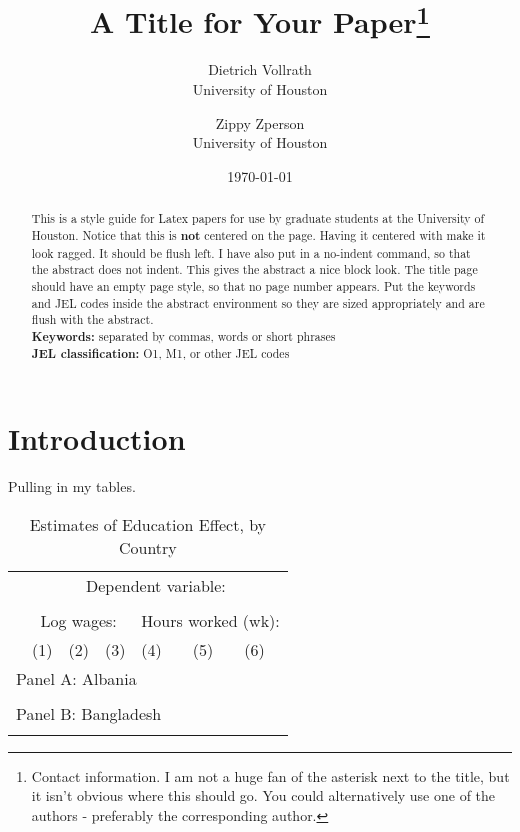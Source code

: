 \documentclass[11pt]{article}
\title{A Title for Your Paper\thanks{Contact information. I am not a huge fan of the asterisk next to the title, but it isn't obvious where this should go. You could alternatively use one of the authors - preferably the corresponding author.}}
\author{ %
    Dietrich Vollrath \\ 
    University of Houston
    \and
    Zippy Zperson \\
    University of Houston
}
\date{\today}
\begin{document}
\maketitle
\thispagestyle{empty}

\begin{abstract} %
\noindent This is a style guide for Latex papers for use by graduate students at the University of Houston. Notice that this is \textbf{not} centered on the page. Having it centered with make it look ragged. It should be flush left. I have also put in a no-indent command, so that the abstract does not indent. This gives the abstract a nice block look. The title page should have an empty page style, so that no page number appears. Put the keywords and JEL codes inside the abstract environment so they are sized appropriately and are flush with the abstract.\\

\noindent \textbf{Keywords:} separated by commas, words or short phrases \\

\noindent \textbf{JEL classification:} O1, M1, or other JEL codes
\end{abstract}

\newpage %
\setcounter{page}{1} %

\section{Introduction}
\onehalfspacing Pulling in my tables.

\clearpage

\begin{table}[!htb]
\begin{center}
\caption{Estimates of Education Effect, by Country}
\label{TAB_effect}
{\footnotesize
\begin{tabularx}{\textwidth}{lXXXXXX}
\toprule
 & \multicolumn{6}{c}{Dependent variable:} \\ \\
 & \multicolumn{3}{c}{Log wages:} & \multicolumn{3}{c}{Hours worked (wk):} \\ \cmidrule(lr){2-4} \cmidrule(lr){5-7}
 & (1) & (2) & (3) & (4) & (5) & (6) \\ \midrule
\multicolumn{7}{l}{Panel A: Albania} \\ \\

\midrule
\multicolumn{7}{l}{Panel B: Bangladesh} \\ \\

\bottomrule
\end{tabularx}
}
\end{center}
\vspace{-.5cm}
\end{table}
\end{document}
